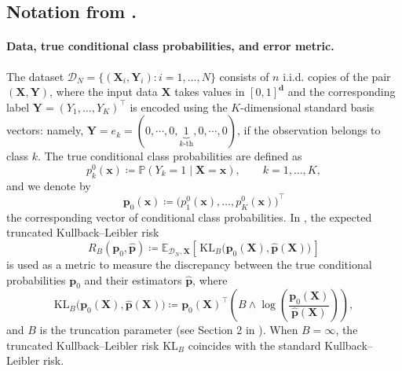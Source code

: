 \documentclass{article}
\theoremstyle{plain}
\theoremstyle{definition}
\theoremstyle{remark}
\newcommand{\EE}{\mathbb{E}}
\newcommand{\calD}{\mathcal{D}}
\begin{document}


\subsection{Notation from \citet{bos2022}.} \label{sec:bos-notation}

\paragraph{Data, true conditional class probabilities, and error metric.} The dataset $\calD_N=\{(\mathbf{X}_i, \mathbf{Y}_i):i=1, ..., N\}$ consists of $n$ i.i.d. copies of the pair $(\mathbf{X}, \mathbf{Y})$, where the input data $\mathbf{X}$ takes values in $[0,1]^\mathbf{d}$ and the corresponding label
$\mathbf{Y}=(Y_1,\ldots,Y_K)^\top$ is encoded using the $K$-dimensional standard basis vectors: namely, $\mathbf{Y}=e_k=(0, \cdots, 0,\underset{k\text{-th}}{\underbrace{1}},0,\cdots, 0)$, if the observation belongs to class $k$. The true conditional class probabilities are defined as\begin{equation}\label{eq:true-cond-bos2022}    p_k^0(\mathbf{x})\coloneqq \mathbb{P}(Y_k=1\mid \mathbf{X}=\mathbf{x}), \qquad k=1,\ldots,K,\end{equation}
and we denote by\begin{equation}\label{eq:true-cond-vector-bos2022} 
     \mathbf{p}_0(\mathbf{x})\coloneqq \big(p_1^0(\mathbf{x}),\ldots,p_K^0(\mathbf{x})\big)^\top
\end{equation}  the corresponding vector of conditional class probabilities. In \citet{bos2022}, the expected truncated Kullback--Leibler risk 
\begin{equation}\label{eq:bos-error-def-RB}
    R_B(\mathbf{p}_0, \widehat{\mathbf{p}})\coloneqq \EE_{\calD_{N}, \mathbf{X}}\left[\,\mathrm{KL}_B\big( \mathbf{p}_0(\mathbf{X}), \widehat{\mathbf{p}}(\mathbf{X})\big)\,\right]
\end{equation}
is used as a metric to measure the discrepancy between the true conditional probabilities $\mathbf{p}_0$ and their estimators $\widehat{\mathbf{p}}$, where
\begin{equation}\label{eq:def-bos-truncated-Kullback--Leibler}
\mathrm{KL}_B \big(\mathbf{p}_0(\mathbf{X}), \widehat{\mathbf{p}}(\mathbf{X})\big) \coloneqq \mathbf{p}_0(\mathbf{X})^{\top} \left( B\wedge \log \left( \frac{\mathbf{p}_0(\mathbf{X})}{\widehat{\mathbf{p}}(\mathbf{X})}\right)\right),
\end{equation}
and $B$ is the truncation parameter (see Section 2 in \citet{bos2022}). When $B=\infty$, the truncated Kullback--Leibler risk $\mathrm{KL}_B$ coincides with the standard Kullback--Leibler risk.
\end{document}
